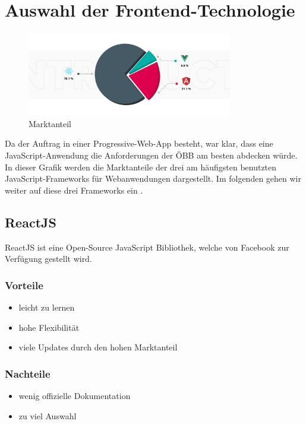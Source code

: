 \section{Auswahl der Frontend-Technologie}

\begin{figure}[h]
    \centering
    \includegraphics[width=0.80\textwidth]{pics/AngularReactVue.png}
    \caption{Marktanteil}
    \label{fig:angular_react_vue}
\end{figure}

Da der Auftrag in einer Progressive-Web-App besteht, war klar, dass eine JavaScript-Anwendung die Anforderungen der ÖBB am besten
abdecken würde. In dieser Grafik werden die Marktanteile der drei am häufigsten benutzten JavaScript-Frameworks für
Webanwendungen dargestellt. Im folgenden gehen wir weiter auf diese drei Frameworks ein \cite{framweokrs}.

\subsection{ReactJS}
ReactJS ist eine Open-Source JavaScript Bibliothek, welche von Facebook zur Verfügung gestellt wird.

\subsubsection{Vorteile}
\begin{itemize}
    \item leicht zu lernen
    \item hohe Flexibilität
    \item viele Updates durch den hohen Marktanteil
\end{itemize}

\subsubsection{Nachteile}
\begin{itemize}
    \item wenig offizielle Dokumentation
    \item \dq zu viel Auswahl\dq
\end{itemize}

